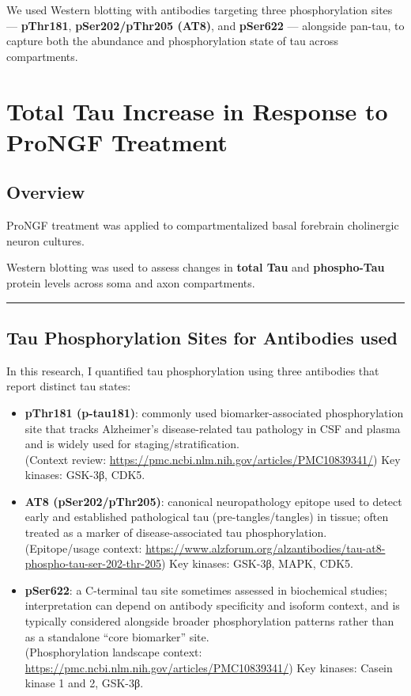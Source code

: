 \documentclass[
]{article}
\begin{document}
We used Western blotting with antibodies targeting three phosphorylation sites ---
\textbf{pThr181}, \textbf{pSer202/pThr205 (AT8)}, and \textbf{pSer622} --- alongside pan-tau,
to capture both the abundance and phosphorylation state of tau across
compartments.

\section{Total Tau Increase in Response to ProNGF Treatment}\label{total-tau-increase-in-response-to-prongf-treatment}

\subsection{Overview}\label{overview}

ProNGF treatment was applied to compartmentalized basal forebrain cholinergic neuron cultures.

Western blotting was used to assess changes in \textbf{total Tau} and \textbf{phospho-Tau} protein levels across soma and axon compartments.

\begin{center}\rule{0.5\linewidth}{0.5pt}\end{center}

\subsection{Tau Phosphorylation Sites for Antibodies used}\label{tau-phosphorylation-sites-for-antibodies-used}

In this research, I quantified tau phosphorylation using three antibodies that report distinct tau states:

\begin{itemize}
\item
  \textbf{pThr181 (p-tau181)}: commonly used biomarker-associated phosphorylation site that tracks Alzheimer's disease-related tau pathology in CSF and plasma and is widely used for staging/stratification.\\
  (Context review: \url{https://pmc.ncbi.nlm.nih.gov/articles/PMC10839341/})
  Key kinases: GSK-3β, CDK5.
\item
  \textbf{AT8 (pSer202/pThr205)}: canonical neuropathology epitope used to detect early and established pathological tau (pre-tangles/tangles) in tissue; often treated as a marker of disease-associated tau phosphorylation.\\
  (Epitope/usage context: \url{https://www.alzforum.org/alzantibodies/tau-at8-phospho-tau-ser-202-thr-205})
  Key kinases: GSK-3β, MAPK, CDK5.
\item
  \textbf{pSer622}: a C-terminal tau site sometimes assessed in biochemical studies; interpretation can depend on antibody specificity and isoform context, and is typically considered alongside broader phosphorylation patterns rather than as a standalone ``core biomarker'' site.\\
  (Phosphorylation landscape context: \url{https://pmc.ncbi.nlm.nih.gov/articles/PMC10839341/})
  Key kinases: Casein kinase 1 and 2, GSK-3β.
\end{itemize}
\end{document}
